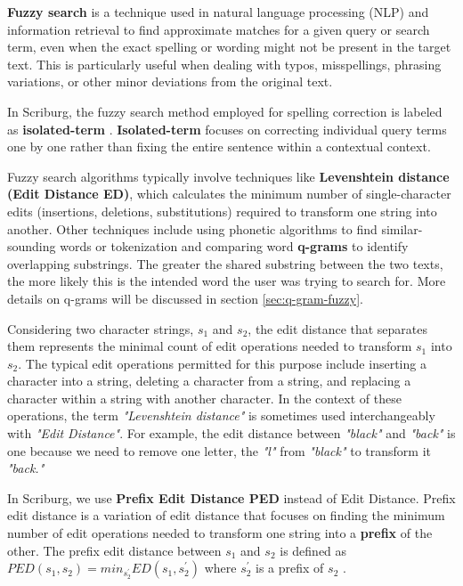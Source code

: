 \textbf{Fuzzy search} is a technique used in natural language processing (NLP) and information retrieval to find approximate matches for a given query or search term, even when the exact spelling or wording might not be present in the target text. This is particularly useful when dealing with typos, misspellings, phrasing variations, or other minor deviations from the original text.

In Scriburg, the fuzzy search method employed for spelling correction is labeled as \textbf{isolated-term} \cite{manning2008}. \textbf{Isolated-term} focuses on correcting individual query terms one by one rather than fixing the entire sentence within a contextual context.

Fuzzy search algorithms typically involve techniques like \textbf{Levenshtein distance (Edit Distance ED)}, which calculates the minimum number of single-character edits (insertions, deletions, substitutions) required to transform one string into another. Other techniques include using phonetic algorithms to find similar-sounding words or tokenization and comparing word \textbf{q-grams} to identify overlapping substrings. The greater the shared substring between the two texts, the more likely this is the intended word the user was trying to search for. More details on q-grams will be discussed in section \ref{sec:q-gram-fuzzy}.


Considering two character strings, $s_1$ and $s_2$, the edit distance that separates them represents the minimal count of edit operations needed to transform $s_1$ into $s_2$. The typical edit operations permitted for this purpose include inserting a character into a string, deleting a character from a string, and replacing a character within a string with another character. In the context of these operations, the term \textit{"Levenshtein distance"} is sometimes used interchangeably with \textit{"Edit Distance"}. For example, the edit distance between \textit{"black"} and \textit{"back"} is one because we need to remove one letter, the \textit{"l"} from \textit{"black"} to transform it \textit{"back."} 

In Scriburg, we use \textbf{Prefix Edit Distance PED} instead of Edit Distance. Prefix edit distance is a variation of edit distance that focuses on finding the minimum number of edit operations needed to transform one string into a \textbf{prefix} of the other. The prefix edit distance between $s_1$ and $s_2$ is defined as $PED(s_1, s_2) = min_{s_2^{'}} ED(s_1, s_2^{'})$ where $s_2^{'}$ is a prefix of $s_2$ \cite{freiburg2023ir}.


